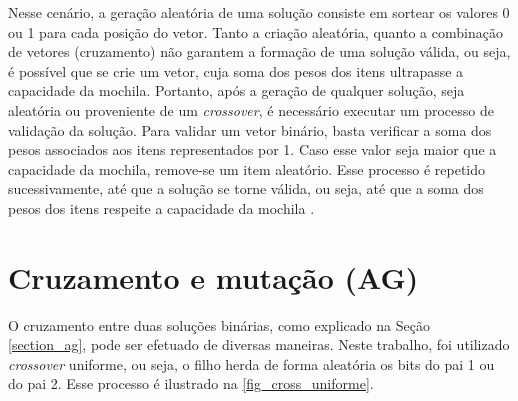 Nesse cenário, a geração aleatória de uma solução consiste em sortear os valores 0 ou 1 para cada posição do vetor. Tanto a criação aleatória, quanto a combinação de vetores (cruzamento) não garantem a formação de uma solução válida, ou seja, é possível que se crie um vetor, cuja soma dos pesos dos itens ultrapasse a capacidade da mochila. Portanto, após a geração de qualquer solução, seja aleatória ou proveniente de um \textit{crossover}, é necessário executar um processo de validação da solução. Para validar um vetor binário, basta verificar a soma dos pesos associados aos itens representados por 1. Caso esse valor seja maior que a capacidade da mochila, remove-se um item aleatório. Esse processo é repetido sucessivamente, até que a solução se torne válida, ou seja, até que a soma dos pesos dos itens respeite a capacidade da mochila \cite{Ishibuchi2015}.

\section{Cruzamento e mutação (AG)}
O cruzamento entre duas soluções binárias, como explicado na Seção \ref{section_ag}, pode ser efetuado de diversas maneiras. Neste trabalho, foi utilizado \textit{crossover} uniforme, ou seja, o filho herda de forma aleatória os bits do pai 1 ou do pai 2. Esse processo é ilustrado na \autoref{fig_cross_uniforme}.

